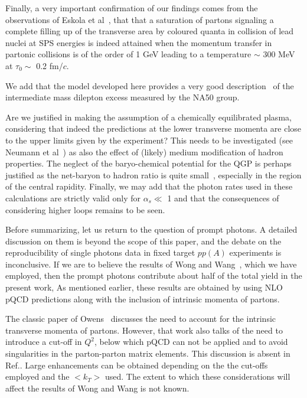 Finally, a very important confirmation of our findings comes from
the observations of Eskola et al~\cite{sat}, that
that a saturation of partons signaling
a complete filling up of the transverse area  by coloured quanta
in collision of lead nuclei at SPS energies is indeed attained when
the momentum transfer in partonic collisions is of the order of 1 GeV
leading to a temperature $\sim$ 300 MeV at $\tau_0\sim$
0.2 fm/$c$.

We add that the model developed here provides a very good
description~\cite{had_dil} of the intermediate mass dilepton 
excess measured by the NA50 group. 

Are we justified in making the assumption of a chemically equilibrated plasma,
 considering that
indeed the predictions at the lower transverse momenta are close to the
upper limits given by the experiment? This needs to be investigated (see
Neumann et al~\cite{others}) as also
the effect of (likely) medium modification of hadron properties.
The neglect of the baryo-chemical potential for the QGP is perhaps 
justified as the net-baryon to hadron ratio is quite small~\cite{xu},
 especially in the region of the central rapidity. 
Finally, we may add that the photon rates used in these calculations
are strictly valid only for $\alpha_s \ll$ 1 and  that the consequences
of considering higher loops remains to be seen.

Before summarizing, let us return to the question of prompt photons.
A detailed discussion on them is beyond the scope of this paper,
and the debate on the reproducibility of single photons data in
fixed target  $pp(A)$ experiments is inconclusive.
  If we are to believe the results of Wong and Wang~\cite{wong},
which we have employed, then the prompt photons contribute  
about half of the total yield in the present work,
As mentioned earlier, these results are
obtained by using NLO pQCD predictions along with the inclusion of 
intrinsic momenta of partons.

  The classic paper of Owens~\cite{owens} discusses
the need to account for the intrinsic transverse momenta of partons. However,
that work also talks of the need to introduce a cut-off in $Q^2$,
below which pQCD can not be applied and to avoid singularities
in the parton-parton matrix elements. This discussion is absent
in Ref.\cite{wong,jane}.  Large 
enhancements can be obtained depending on the the cut-offs employed
and the $<k_T>$ used. The extent to which these considerations
will affect the results of Wong and Wang is not known.

